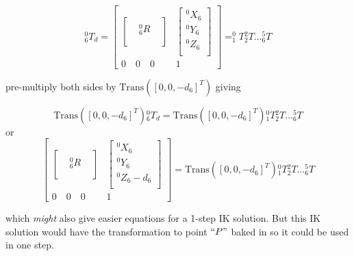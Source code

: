 \[
^0_6T_d =
\begin{bmatrix}
\begin{bmatrix}  &  &  \\  & ^0_6R&  \\ & & \\ \end{bmatrix}      &
 \begin{bmatrix} ^0X_6 \\ ^0Y_6  \\ ^0Z_6 \\ \end{bmatrix}            \\
 0 \quad 0 \quad 0      &   1
\end{bmatrix} =
^0_1T{^2_2T}\dots{^5_6T}
\]

pre-multiply both sides by $\mathrm{Trans}([0,0,-d_6]^T)$ giving

\[
\mathrm{Trans}([0,0,-d_6]^T) {^0_6T_d} = 
\mathrm{Trans}([0,0,-d_6]^T) {^0_1T}{^2_2T}\dots{^5_6T}
\]
or
\[\begin{bmatrix}
\begin{bmatrix}  &  &  \\  & ^0_6R&  \\ & & \\ \end{bmatrix}      &
 \begin{bmatrix} ^0X_6 \\ ^0Y_6  \\ ^0Z_6-d_6 \\ \end{bmatrix}            \\
 0 \quad 0 \quad 0      &   1
\end{bmatrix} =
\mathrm{Trans}([0,0,-d_6]^T) {^0_1T}{^2_2T}\dots{^5_6T}
\]

which {\it might} also give easier equations for a 1-step IK solution.  But this IK solution would 
have the transformation to point $``P"$ baked in so it could be used in one step. 


